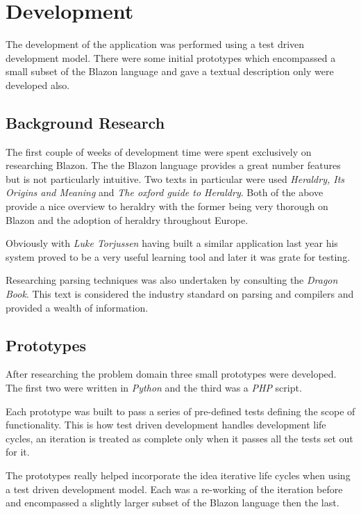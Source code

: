 \chapter{Development}

The development of the application was performed using a test driven development model.  There were some initial prototypes which encompassed a small subset of the Blazon language and gave a textual description only were developed also. 


\section{Background Research}
The first couple of weeks of development time were spent exclusively on researching Blazon.  The the Blazon language provides a great number features  but is not particularly intuitive.  Two texts in particular were used \emph{ Heraldry, Its Origins and Meaning}\cite{bob} and \emph{The oxford guide to Heraldry}\cite{oxford}.  Both of the above provide a nice overview to heraldry with the former being very thorough on Blazon and the adoption of heraldry throughout Europe. 

Obviously with \emph{Luke Torjussen} having built a similar application\cite{luke} last year his system proved to be a very useful learning tool and later it was grate for testing.  

Researching parsing techniques was also undertaken by consulting the \emph{Dragon Book}\cite{dragon}.  This text is considered the industry standard on parsing and compilers and provided a wealth of information. 


\section{Prototypes}

After researching the problem domain three small prototypes were developed.  The first two were written in \emph{Python} and the third was a \emph{PHP} script.  

Each prototype was built to pass a series of pre-defined tests defining the scope of functionality.  This is how test driven development handles development life cycles, an iteration is treated as complete only when it passes all the tests set out for it. 

The prototypes really helped incorporate the idea iterative life cycles when using a test driven development model.  Each was a re-working of the iteration before  and encompassed a slightly larger subset of the Blazon language then the last.


